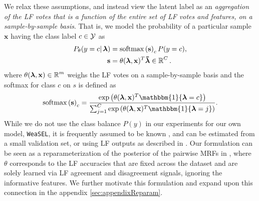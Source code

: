 \documentclass{article}
\newcommand{\softmax}{\mathrm{softmax}}
\newcommand{\weasel}{\texttt{WeaSEL}}\newcommand{\brackets}[1]{\left( #1 \right)}
\newcommand{\indicator}[1]{\mathbbm{1}\{ #1 \}}
\newcommand{\features}{\mathbf{x}}
\newcommand{\lambdaOnehot}{\accentset{\rule{.4em}{.8pt}}{\lfs}}
\begin{document}
We relax these assumptions, and instead view the latent label as an \emph{aggregation of the LF votes that is a function of the entire set of LF votes and features, on a sample-by-sample basis}.
That is, we model the probability of a particular sample $\features$ having the class label $c \in \operatorname{\mathcal{Y}}$ as
\begin{align}
    P_\theta(y = c | \lfs) 
    &= \softmax \brackets{ \mathbf{s} }_c P(y = c),
    \label{eq:softlabels} \\
    \mathbf{s}
    &= \theta(\lfs,  \features)^T \lambdaOnehot \in \R^C.
\end{align}
where $\theta(\operatorname{\bm{\lambda}},  \mathbf{x}) \in \operatorname{\mathbb{R}}^m$ weighs the LF votes on a sample-by-sample basis and the softmax for class $c$ on $s$ is defined as
\begin{equation*}
    \softmax \brackets{ \mathbf{s} }_c
    =
    \frac
    {\exp\brackets{\theta(\lfs,  \features)^T\indicator{\lfs = c}}}
    {\sum_{j=1}^C\exp\brackets{\theta(\lfs,  \features)^T\indicator{\lfs = j}}}.
\end{equation*}
While we do not use the class balance $P(y)$ in our experiments for our own model, \weasel, it is frequently assumed to be known \cite{Multitask, triplets, TripletsMean}, and can be estimated from a small validation set, or  using LF outputs as described in \cite{Multitask}. 
Our formulation can be seen as a reparameterization of the posterior of the pairwise MRFs in \cite{Snorkel, Multitask, triplets}, where $\theta$ corresponds to the LF accuracies that are fixed across the dataset and are solely learned via LF agreement and disagreement signals, ignoring the informative features. 
We further motivate this formulation and expand upon this connection in the appendix \ref{sec:appendixReparam}.
\end{document}
